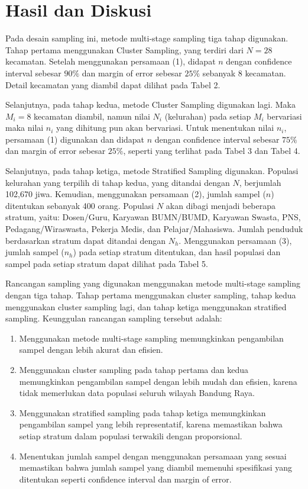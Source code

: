 \documentclass{article}
\begin{document}
\section{Hasil dan Diskusi}
Pada desain sampling ini, metode multi-stage sampling tiga tahap digunakan. Tahap pertama menggunakan Cluster Sampling, yang terdiri dari $N=28$ kecamatan. Setelah menggunakan persamaan (1), didapat $n$ dengan confidence interval sebesar $90\%$ dan margin of error sebesar $25\%$ sebanyak $8$ kecamatan. Detail kecamatan yang diambil dapat dilihat pada Tabel 2.

Selanjutnya, pada tahap kedua, metode Cluster Sampling digunakan lagi. Maka $M_i=8$ kecamatan diambil, namun nilai $N_i$ (kelurahan) pada setiap $M_i$ bervariasi maka nilai $n_i$ yang dihitung pun akan bervariasi. Untuk menentukan nilai $n_i$, persamaan (1) digunakan dan didapat $n$ dengan confidence interval sebesar $75\%$ dan margin of error sebesar $25\%$, seperti yang terlihat pada Tabel 3 dan Tabel 4.

Selanjutnya, pada tahap ketiga, metode Stratified Sampling digunakan. Populasi kelurahan yang terpilih di tahap kedua, yang ditandai dengan $N$, berjumlah 102,670 jiwa. Kemudian, menggunakan persamaan (2), jumlah sampel ($n$) ditentukan sebanyak 400 orang. Populasi $N$ akan dibagi menjadi beberapa stratum, yaitu: Dosen/Guru, Karyawan BUMN/BUMD, Karyawan Swasta, PNS, Pedagang/Wiraswasta, Pekerja Medis, dan Pelajar/Mahasiswa. Jumlah penduduk berdasarkan stratum dapat ditandai dengan $N_h$. Menggunakan persamaan (3), jumlah sampel ($n_h$) pada setiap stratum ditentukan, dan hasil populasi dan sampel pada setiap stratum dapat dilihat pada Tabel 5.

Rancangan sampling yang digunakan menggunakan metode multi-stage sampling dengan tiga tahap. Tahap pertama menggunakan cluster sampling, tahap kedua menggunakan cluster sampling lagi, dan tahap ketiga menggunakan stratified sampling. Keunggulan rancangan sampling tersebut adalah:
\begin{enumerate}
    \item Menggunakan metode multi-stage sampling memungkinkan pengambilan sampel dengan lebih akurat dan efisien.
    \item Menggunakan cluster sampling pada tahap pertama dan kedua memungkinkan pengambilan sampel dengan lebih mudah dan efisien, karena tidak memerlukan data populasi seluruh wilayah Bandung Raya.
    \item Menggunakan stratified sampling pada tahap ketiga memungkinkan pengambilan sampel yang lebih representatif, karena memastikan bahwa setiap stratum dalam populasi terwakili dengan proporsional.
    \item Menentukan jumlah sampel dengan menggunakan persamaan yang sesuai memastikan bahwa jumlah sampel yang diambil memenuhi spesifikasi yang ditentukan seperti confidence interval dan margin of error.
\end{enumerate}
\end{document}
